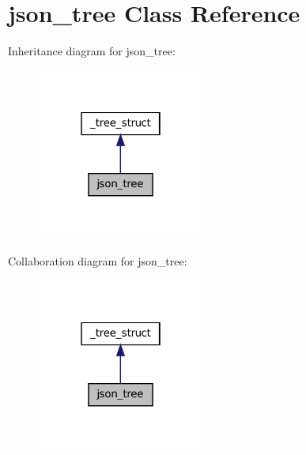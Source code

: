 \hypertarget{classjson__tree}{
\section{json\_\-tree Class Reference}
\label{classjson__tree}
}


Inheritance diagram for json\_\-tree:\nopagebreak
\begin{figure}[H]
\begin{center}
\leavevmode
\includegraphics[width=154pt]{classjson__tree__inherit__graph}
\end{center}
\end{figure}


Collaboration diagram for json\_\-tree:\nopagebreak
\begin{figure}[H]
\begin{center}
\leavevmode
\includegraphics[width=154pt]{classjson__tree__coll__graph}
\end{center}
\end{figure}
